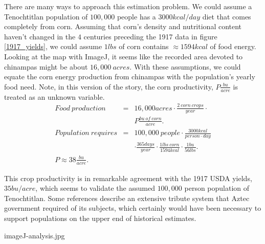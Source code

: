 \documentclass[onecolumn]{article}
\newcommand{\bea}{\begin{eqnarray}}
\newcommand{\eea}{\end{eqnarray}}
\begin{document}
There are many ways to approach this estimation problem.  We could assume a Tenochtitlan population of $100,000$ people has a $3000kcal/day$ diet that comes completely from corn.  Assuming that corn's density and nutritional content haven't changed in the $4$ centuries preceding the 1917 data in figure \ref{1917_yields}, we could assume $1lbs$ of corn contains $\approx1594kcal$ of food energy.  
Looking at the map with ImageJ, \cite{imageJ} it seems like the recorded area devoted to chinampas might be about $16,000~acres$.
With these assumptions, we could equate the corn energy production from chinampas with the population's yearly food need. Note, in this version of the story, the corn productivity, $P\frac{bu}{acre}$ is treated as an unknown variable.  
\bea
Food~production &=& 16,000acres\cdot \frac{2~corn~crops}{year}\cdot \nonumber \\
&& P \frac{bu~of~corn}{acre} . \\
Population~requires &=& 100,000~people\cdot \frac{3000kcal}{person\cdot day} \nonumber\\
&& \cdot\frac{365days}{year}\cdot\frac{1lbs~corn}{1594kcal}\cdot\frac{1bu}{56lbs} . \\
P \approx 38\frac{bu}{acre} . && 
\eea

This crop productivity is in remarkable agreement with the 1917 USDA yields, $35bu/acre$, which seems to validate the assumed $100,000$ person population of Tenochtitlan.  Some references \cite{Chinampas_1964} describe an extensive tribute system that Aztec government required of its subjects, which certainly would have been necessary to support populations on the upper end of historical estimates. \cite{400k}

imageJ-analysis.jpg

\clearpage
\newpage
\end{document}
